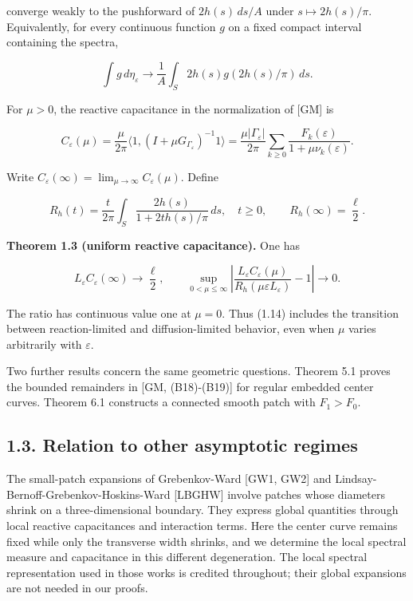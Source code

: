 \documentclass[11pt]{article}
\begin{document}
converge weakly to the pushforward of \(2h(s)\,ds/A\) under
\(s\mapsto2h(s)/\pi\). Equivalently, for every continuous function \(g\)
on a fixed compact interval containing the spectra,

\[
\int g\,d\eta_\varepsilon\longrightarrow
 \frac1A\int_S2h(s)g(2h(s)/\pi)\,ds.
\tag{1.11}
\]

For \(\mu>0\), the reactive capacitance in the normalization of {[}GM{]}
is

\[
C_\varepsilon(\mu)=\frac{\mu}{2\pi}
 \langle1,(I+\mu G_{\Gamma_\varepsilon})^{-1}1\rangle
 =\frac{\mu|\Gamma_\varepsilon|}{2\pi}
 \sum_{k\ge0}\frac{F_k(\varepsilon)}{1+\mu\nu_k(\varepsilon)}.
\tag{1.12}
\]

Write \(C_\varepsilon(\infty)=\lim_{\mu\to\infty}C_\varepsilon(\mu)\).
Define

\[
R_h(t)=\frac{t}{2\pi}\int_S\frac{2h(s)}{1+2t h(s)/\pi}\,ds,
\quad t\ge0,\qquad R_h(\infty)=\frac\ell2.
\tag{1.13}
\]

\textbf{Theorem 1.3 (uniform reactive capacitance).} One has

\[
L_\varepsilon C_\varepsilon(\infty)\longrightarrow\frac\ell2,
\qquad
\sup_{0<\mu\le\infty}
\left|\frac{L_\varepsilon C_\varepsilon(\mu)}
 {R_h(\mu\varepsilon L_\varepsilon)}-1\right|\longrightarrow0.
\tag{1.14}
\]

The ratio has continuous value one at \(\mu=0\). Thus (1.14) includes
the transition between reaction-limited and diffusion-limited behavior,
even when \(\mu\) varies arbitrarily with \(\varepsilon\).

Two further results concern the same geometric questions. Theorem 5.1
proves the bounded remainders in {[}GM, (B18)-(B19){]} for regular
embedded center curves. Theorem 6.1 constructs a connected smooth patch
with \(F_1>F_0\).

\subsection{1.3. Relation to other asymptotic
regimes}\label{relation-to-other-asymptotic-regimes}

The small-patch expansions of Grebenkov-Ward {[}GW1, GW2{]} and
Lindsay-Bernoff-Grebenkov-Hoskins-Ward {[}LBGHW{]} involve patches whose
diameters shrink on a three-dimensional boundary. They express global
quantities through local reactive capacitances and interaction terms.
Here the center curve remains fixed while only the transverse width
shrinks, and we determine the local spectral measure and capacitance in
this different degeneration. The local spectral representation used in
those works is credited throughout; their global expansions are not
needed in our proofs.
\end{document}
